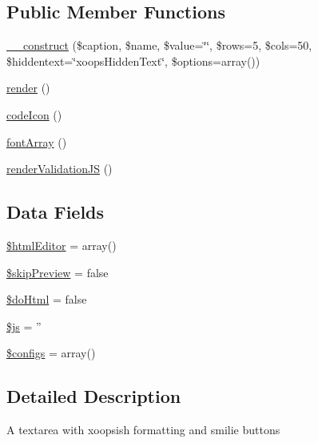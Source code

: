 \subsection*{Public Member Functions}
\begin{DoxyCompactItemize}
\item 
\hyperlink{class_xoops_form_dhtml_text_area_a7f1529c70e84a7fc20288ce43504fbd7}{\-\_\-\-\_\-construct} (\$caption, \$name, \$value=\char`\"{}\char`\"{}, \$rows=5, \$cols=50, \$hiddentext=\char`\"{}xoops\-Hidden\-Text\char`\"{}, \$options=array())
\item 
\hyperlink{class_xoops_form_dhtml_text_area_afde88292c44dc59faf017738dae6dffb}{render} ()
\item 
\hyperlink{class_xoops_form_dhtml_text_area_acb81ef17f7e7796804e22ca93aeb6fd5}{code\-Icon} ()
\item 
\hyperlink{class_xoops_form_dhtml_text_area_ab30939ed7ed069182752a0a763d4d2bd}{font\-Array} ()
\item 
\hyperlink{class_xoops_form_dhtml_text_area_a2747262e7fc6aba84bfc52bcf38407df}{render\-Validation\-J\-S} ()
\end{DoxyCompactItemize}
\subsection*{Data Fields}
\begin{DoxyCompactItemize}
\item 
\hyperlink{class_xoops_form_dhtml_text_area_a329008b431ffa2c4030435018c8d773c}{\$html\-Editor} = array()
\item 
\hyperlink{class_xoops_form_dhtml_text_area_aa0dd4edcea52081fc67fdc3053edc2ed}{\$skip\-Preview} = false
\item 
\hyperlink{class_xoops_form_dhtml_text_area_afbcedef390be09deb8c4939b7cfab1eb}{\$do\-Html} = false
\item 
\hyperlink{class_xoops_form_dhtml_text_area_a747181e96d083c6396169e81e4d2056d}{\$js} = ''
\item 
\hyperlink{class_xoops_form_dhtml_text_area_a95691168d68a876ecc24c7dad14ef24e}{\$configs} = array()
\end{DoxyCompactItemize}


\subsection{Detailed Description}
A textarea with xoopsish formatting and smilie buttons 

